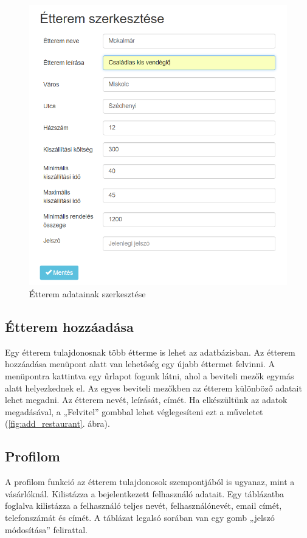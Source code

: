 \begin{figure}
\centering
\includegraphics[scale=0.8]{kepek/edit_restaurant.png}
\caption{Étterem adatainak szerkesztése}
\label{fig:edit_restaurnt}
\end{figure}

\subsection{Étterem hozzáadása}

Egy étterem tulajdonosnak több étterme is lehet az adatbázisban. Az étterem hozzáadása menüpont alatt van lehetőség egy újabb éttermet felvinni. 
A menüpontra kattintva egy űrlapot fogunk látni, ahol a beviteli mezők egymás alatt helyezkednek el. Az egyes beviteli mezőkben az étterem különböző adatait lehet megadni. Az étterem nevét, leírását, címét. Ha elkészültünk az adatok megadásával, a „Felvitel” gombbal lehet véglegesíteni ezt a műveletet (\ref{fig:add_restaurant}. ábra).

\subsection{Profilom}

A profilom funkció az étterem tulajdonosok szempontjából is ugyanaz, mint a vásárlóknál. Kilistázza a bejelentkezett felhasználó adatait. Egy táblázatba foglalva kilistázza a felhasználó teljes nevét, felhasználónevét, email címét, telefonszámát és címét. A táblázat legalsó sorában van egy gomb „jelszó módosítása” felirattal.

